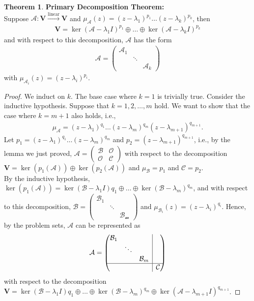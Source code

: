 \documentclass{book}
\theoremstyle{definition}
\newtheorem{thm}{Theorem}[section]
\newcommand{\V}{\mathbf{V}}
\newcommand{\A}{\mathcal{A}}
\newcommand{\lin}{\overset{\text{linear}}{\longrightarrow}}
\newcommand{\rvline}{\hspace*{-\arraycolsep}\vline\hspace*{-\arraycolsep}}
\begin{document}
\begin{thm}
	\textbf{Primary Decomposition Theorem:}\\ Suppose $\A : \V \lin \V$ and $\mu_\A(z) = (z-\lambda_1)^{p_1}\dots (z-\lambda_k)^{p_k}$, then 
	\begin{align*}
	\V = \ker(\A - \lambda_1 I )^{p_1} \oplus \dots \oplus \ker(\A - \lambda_k I)^{p_k}
	\end{align*}
	and with respect to this decomposition, $\A$ has the form
	\begin{align*}
	\A = \begin{pmatrix}
	\A_1 & & \\
	& \ddots &\\
	& & \A_k 
	\end{pmatrix}
	\end{align*}
	with $\mu_{\A_i}(z) = (z - \lambda_i)^{p_i}$.
	
	
	\begin{proof}
		We induct on $k$. The base case where $k=1$ is trivially true. Consider the inductive hypothesis. Suppose that $k=1,2,\dots,m$ hold. We want to show that the case where $k = m+1$ also holds, i.e., 
		\begin{align*}
		\mu_\A = (z- \lambda_1)^{q_1}\dots (z - \lambda_m)^{q_m}(z - \lambda_{m+1})^{q_{m+1}}.
		\end{align*}
		Let $p_1 = (z- \lambda_1)^{q_1}\dots (z - \lambda_m)^{q_m}$ and $p_2 = (z - \lambda_{m+1})^{q_{m+1}}$, i.e., by the lemma we just proved, $\A = \begin{pmatrix}
		\mathcal{B} & \mathcal{O}\\
		\mathcal{O} & \mathcal{C}
		\end{pmatrix}$ with respect to the decomposition $\V = \ker(p_1(\A)) \oplus \ker(p_2(\A))$ and $\mu_\mathcal{B} = p_1$ and $\mathcal{C} = p_2$. \\
		
		By the inductive hypothesis, $\ker(p_1(\A)) = \ker(\mathcal{B} - \lambda_1 I){q_1} \oplus \dots \oplus \ker(\mathcal{B} - \lambda_m)^{q_m}$, and with respect to this decomposition, $\mathcal{B} = \begin{pmatrix}
		\mathcal{B}_1 & & \\
		&\ddots&\\
		&&\mathcal{B_m}
		\end{pmatrix}$ and $\mu_{\mathcal{B}_i}(z) = (z - \lambda_i)^{q_i}$. Hence, by the problem sets, $\A$ can be represented as
		\begin{align*}
		\A = 
		\begin{pmatrix}
		\begin{matrix}
		\mathcal{B}_1 & &\\
		& \ddots &\\
		& & \mathcal{B}_m
		\end{matrix}& \rvline & \\
		\hline
		& \rvline & \mathcal{C}
		\end{pmatrix}
		\end{align*}
		with respect to the decomposition $\V = \ker(\mathcal{B} - \lambda_1 I){q_1} \oplus \dots \oplus \ker(\mathcal{B} - \lambda_m)^{q_m} \oplus \ker(\A - \lambda_{m+1} I )^{q_{m+1}}$.
		

\end{proof}
\end{thm}
\end{document}
